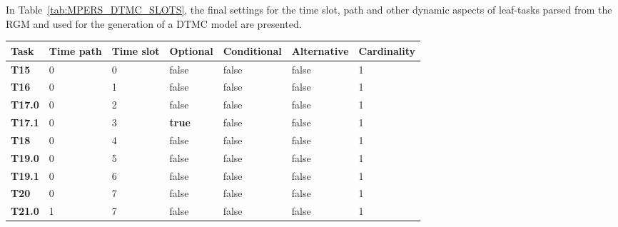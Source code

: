
In Table~\ref{tab:MPERS_DTMC_SLOTS}, the final settings for the time slot, path and other dynamic aspects of leaf-tasks parsed from the RGM and used for the generation of a DTMC model are presented.

\begin{table}[ht!]
{\renewcommand{\arraystretch}{1.5}
\begin{tabularx}{\textwidth}{@{}lllllll@{}}
\toprule
\textbf{Task}  & \textbf{Time path} & \textbf{Time slot} & \textbf{Optional} & \textbf{Conditional} & \textbf{Alternative} & \textbf{Cardinality} \\ \midrule
\textbf{T15}   & 0                  & 0                  & false             & false                & false                & 1           \\
\textbf{T16}   & 0                  & 1                  & false             & false                & false                & 1           \\
\textbf{T17.0} & 0                  & 2                  & false             & false                & false                & 1           \\
\textbf{T17.1} & 0                  & 3                  & \textbf{true}    & false                 & false                & 1           \\
\textbf{T18}   & 0                  & 4                  & false             & false                & false                & 1           \\
\textbf{T19.0} & 0                  & 5                  & false             & false                & false                & 1           \\
\textbf{T19.1} & 0                  & 6                  & false             & false                & false                & 1           \\
\textbf{T20}   & 0                  & 7                  & false             & false                & false                & 1           \\
\textbf{T21.0}   & 1                & 7                  & false             & false                & false                & 1           \\

\end{tabularx}}
\end{table}
